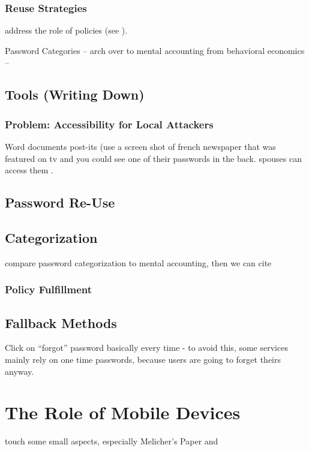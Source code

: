 	
	
	
	\subsubsection{Reuse Strategies}
	address the role of policies (see \cite{Seitz2017PoliciesReuse}).
	
	Password Categories -- arch over to mental accounting from behavioral economics -- \cite{Thaler2004}
	
	\cite{Stobert2015ExpertPassword}
	
	
	\subsection{Tools (Writing Down)}
		\subsubsection{Problem: Accessibility for Local Attackers}
Word documents post-its (use a screen shot of french newspaper that was featured on tv and you could see one of their passwords in the back. spouses can access them .

	\subsection{Password Re-Use}
	
	
	
		\subsection{Categorization}
		compare password categorization to mental accounting, then we can cite \cite{Stockinger2015TowardsBE}
		\subsubsection{Policy Fulfillment}

	\subsection{Fallback Methods}
	Click on ``forgot'' password basically every time - to avoid this, some services mainly rely on one time passwords, because users are going to forget theirs anyway. 

\section{The Role of Mobile Devices}
touch some small aspects, especially Melicher's Paper \cite{Melicher2016UsabilityMobileTextPasswords} and \cite{VonZezschwitz2014HoneyIShrunkTheKeys}
\cite{Haque2014PsychometricsStrongPassword} 

